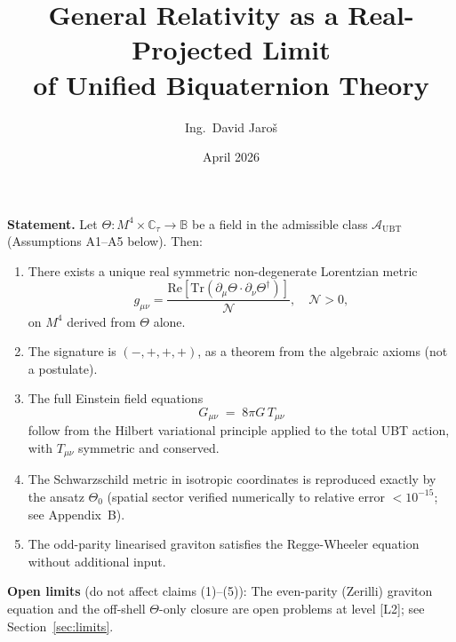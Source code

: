 \documentclass[12pt,a4paper]{article}
\title{\textbf{General Relativity as a Real-Projected Limit\\
       of Unified Biquaternion Theory}}
\author{Ing.\ David Jaroš}
\date{April 2026}
\theoremstyle{definition}
\theoremstyle{remark}
\begin{document}
\maketitle


\begin{tcolorbox}[enhanced,colback=blue!4!white,colframe=blue!55!black,
  arc=3pt,boxrule=1.2pt,
  title={\textbf{\large Main Theorem (GR Recovery)}}]

\textbf{Statement.} Let $\Theta : M^4 \times \mathbb{C}_\tau \to \mathbb{B}$
be a field in the admissible class $\mathcal{A}_{\mathrm{UBT}}$
(Assumptions A1--A5 below).  Then:
\begin{enumerate}[label=\textbf{(\arabic*)}]
  \item There exists a unique real symmetric non-degenerate Lorentzian metric
        \[
          g_{\mu\nu} = \dfrac{\mathrm{Re}[\mathrm{Tr}(\partial_\mu\Theta\cdot\partial_\nu\Theta^\dagger)]}{\mathcal{N}},
          \quad \mathcal{N}>0,
        \]
        on $M^4$ derived from $\Theta$ alone.

  \item The signature is $(-,+,+,+)$, as a theorem from the algebraic axioms
        (not a postulate).

  \item The full Einstein field equations
        \[
          G_{\mu\nu} \;=\; 8\pi G\,T_{\mu\nu}
        \]
        follow from the Hilbert variational principle applied to the total
        UBT action, with $T_{\mu\nu}$ symmetric and conserved.

  \item The Schwarzschild metric in isotropic coordinates is reproduced
        exactly by the ansatz $\Theta_0$ (spatial sector verified numerically
        to relative error $<10^{-15}$; see Appendix~B).

  \item The odd-parity linearised graviton satisfies the Regge-Wheeler
        equation without additional input.
\end{enumerate}

\smallskip
\textbf{Open limits} (do not affect claims (1)--(5)):
The even-parity (Zerilli) graviton equation and the off-shell $\Theta$-only
closure are open problems at level [L2]; see Section~\ref{sec:limits}.
\end{tcolorbox}
\end{document}
